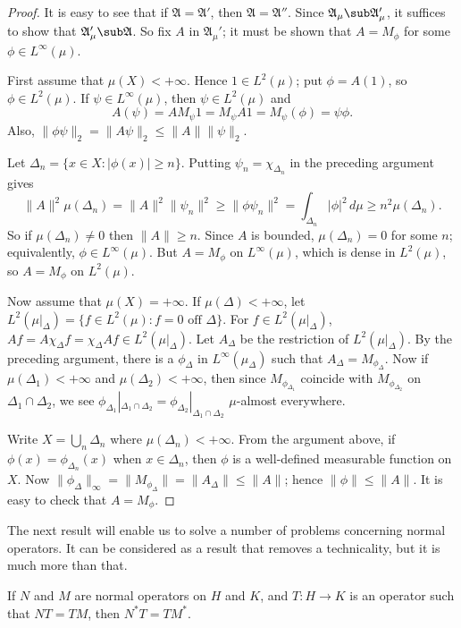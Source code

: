 \begin{proof}
It is easy to see that if $\mathfrak{A}=\mathfrak{A}'$, then $\mathfrak{A}=\mathfrak{A}''$. Since $\mathfrak{A}_\mu\sub\mathfrak{A}_\mu'$, it suffices to show that $\mathfrak{A}_\mu'\sub\mathfrak{A}$. So fix $A$ in $\mathfrak{A}_\mu'$; it must be shown that $A=M_\phi$ for some $\phi\in L^\infty(\mu)$.\par
First assume that $\mu(X)<+\infty$. Hence $1\in L^2(\mu)$; put $\phi=A(1)$, so $\phi\in L^2(\mu)$. If $\psi\in L^\infty(\mu)$, then $\psi\in L^2(\mu)$ and
\[A(\psi)=AM_\psi 1=M_\psi A1=M_\psi(\phi)=\psi\phi.\]
Also, $\|\phi\psi\|_2=\|A\psi\|_2\leq\|A\|\|\psi\|_2$.\par
Let $\Delta_n=\{x\in X:|\phi(x)|\geq n\}$. Putting $\psi_n=\chi_{\Delta_n}$ in the preceding argument gives 
\[\|A\|^2\mu(\Delta_n)=\|A\|^2\|\psi_n\|^2\geq\|\phi\psi_n\|^2=\int_{\Delta_n}|\phi|^2\,d\mu\geq n^2\mu(\Delta_n).\]
So if $\mu(\Delta_n)\neq 0$ then $\|A\|\geq n$. Since $A$ is bounded, $\mu(\Delta_n)=0$ for some $n$; equivalently, $\phi\in L^\infty(\mu)$. But $A=M_\phi$ on $L^\infty(\mu)$, which is dense in $L^2(\mu)$, so $A=M_\phi$ on $L^2(\mu)$.\par
Now assume that $\mu(X)=+\infty$. If $\mu(\Delta)<+\infty$, let $L^2(\mu|_{\Delta})=\{f\in L^2(\mu):\text{$f=0$ off $\Delta$}\}$. For $f\in L^2(\mu|_{\Delta})$, $Af=A\chi_\Delta f=\chi_\Delta Af\in L^2(\mu|_{\Delta})$. Let $A_\Delta$ be the restriction of $L^2(\mu|_{\Delta})$. By the preceding argument, there is a $\phi_\Delta$ in $L^\infty(\mu_{\Delta})$ such that $A_\Delta=M_{\phi_\Delta}$. Now if $\mu(\Delta_1)<+\infty$ and $\mu(\Delta_2)<+\infty$, then since $M_{\phi_{\Delta_1}}$ coincide with $M_{\phi_{\Delta_2}}$ on $\Delta_1\cap\Delta_2$, we see $\phi_{\Delta_1}|_{\Delta_1\cap\Delta_2}=\phi_{\Delta_2}|_{\Delta_1\cap\Delta_2}$ $\mu$-almost everywhere.\par
Write $X=\bigcup_n\Delta_n$ where $\mu(\Delta_n)<+\infty$. From the argument above, if $\phi(x)=\phi_{\Delta_n}(x)$ when $x\in\Delta_n$, then $\phi$ is a well-defined measurable function on $X$. Now $\|\phi_\Delta\|_\infty=\|M_{\phi_{\Delta}}\|=\|A_\Delta\|\leq\|A\|$; hence $\|\phi\|\leq\|A\|$. It is easy to check that $A=M_\phi$.
\end{proof}
The next result will enable us to solve a number of problems concerning normal operators. It can be considered as a result that removes a technicality, but it is much more than that.
\begin{theorem}
If $N$ and $M$ are normal operators on $H$ and $K$, and $T:H\to K$ is an operator such that $NT=TM$, then $N^*T=TM^*$.
\end{theorem}
